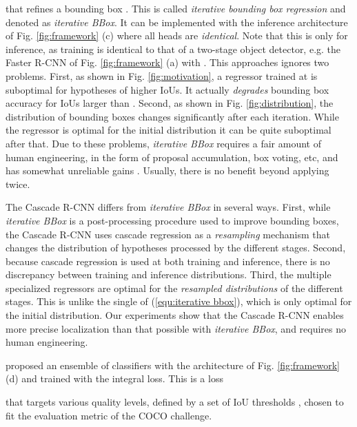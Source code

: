 \documentclass[10pt,journal,compsoc]{IEEEtran}
\begin{document}
that refines a bounding box . This is called
\textit{iterative bounding box regression} and denoted as
\textit{iterative BBox}. It can be implemented with the inference architecture
of Fig. \ref{fig:framework} (c) where all heads are {\it identical\/}.
Note that this is only for inference, as training is identical to that of a
two-stage object detector, e.g. the Faster R-CNN of Fig.
\ref{fig:framework} (a) with .
This approaches ignores two problems. First, as shown in Fig.
\ref{fig:motivation}, a regressor  trained at  is
suboptimal for hypotheses of higher IoUs. It actually {\it degrades\/}
bounding box accuracy for IoUs larger than . Second, as shown in
Fig. \ref{fig:distribution}, the distribution of bounding boxes changes
significantly after each iteration. While the regressor is optimal for the
initial distribution it can be quite suboptimal after that. Due to these
problems, \textit{iterative BBox} requires a fair amount of human
engineering, in the form of proposal accumulation, box voting,
etc, and has somewhat unreliable gains \cite{DBLP:conf/iccv/GidarisK15,DBLP:conf/bmvc/GidarisK16,DBLP:conf/cvpr/HeZRS16}. Usually, there is no benefit beyond applying  twice.

The Cascade R-CNN differs from \textit{iterative BBox} in several ways. First,
while \textit{iterative BBox} is a post-processing procedure used to
improve bounding boxes, the Cascade R-CNN uses cascade regression as
a {\it resampling\/} mechanism that changes the distribution of hypotheses
processed by the different stages. Second, because cascade regression
is used at both training and inference, there is no discrepancy between
training and inference distributions. Third,
the multiple specialized regressors  are
optimal for the {\it resampled distributions\/} of the different stages.
This is unlike the single  of (\ref{equ:iterative bbox}),
which is only optimal for the initial distribution. Our experiments
show that the Cascade R-CNN enables more precise localization than
that possible with \textit{iterative BBox}, and requires no human
engineering.

\vspace{0.2cm}
\cite{DBLP:conf/bmvc/ZagoruykoLLPGCD16} proposed an ensemble of classifiers
with the architecture of Fig. \ref{fig:framework} (d) and trained
with the integral loss. This is a loss

that targets various quality levels, defined by a set of IoU thresholds
, chosen to fit the
evaluation metric of the COCO challenge.
\end{document}

